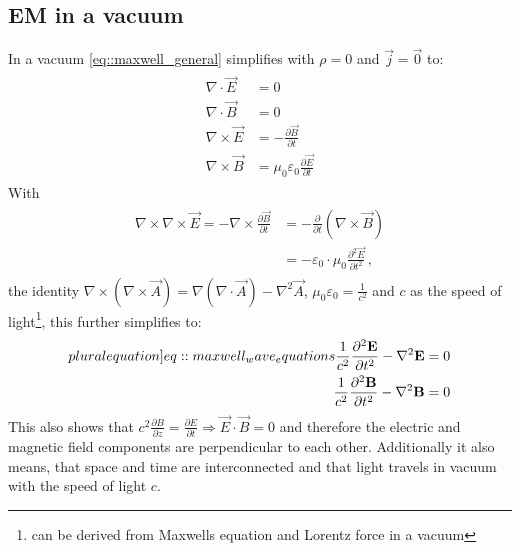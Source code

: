 \subsection{EM in a vacuum}
% 
In a vacuum \cref{eq::maxwell_general} simplifies with $\rho = 0$ and $\vec{j} = \vec{0}$ to:
% 
\begin{align}
\begin{split} \label{eq::maxwell_vacuum}
  \nabla \cdot \vec{E} &= 0 \quad\\
  \nabla \cdot \vec{B} &= 0 \quad\\
  \nabla \times \vec{E} &= -\frac{\partial\vec B}{\partial t}\\
  \nabla \times \vec{B} &= \mu_0\varepsilon_0 \frac{\partial\vec E}{\partial t}
  \end{split}
\end{align}
% 
With 
\begin{align}
\begin{split} 
    \nabla \times \nabla \times \vec{E} = -\nabla \times \frac{\partial \vec{B}} {\partial t} &= -\frac{\partial} {\partial t} \left( \nabla \times  \vec{B} \right)\\
    &= -\varepsilon_0 \cdot \mu_0 \frac{\partial^2 \vec{E}}{\partial t^2} \, ,
\end{split}
\end{align}
% 
the identity $\nabla \times \left( \nabla \times \vec{A} \right) = \nabla(\nabla \cdot \vec{A}) - \nabla^{2}\vec{A}$, $\mu_0\varepsilon_0 = \frac{1}{c^2}$ and $c$ as the speed of light\footnote{can be derived from Maxwells equation and Lorentz force in a vacuum}, this further simplifies to:
% 
\begin{align}
\begin{split} \label[pluralequation]{eq::maxwell_wave_equations}
  \frac{1}{c^2} \frac{\partial^2 \vec{E}}{\partial t^2} - \nabla^2 \vec{E} &= 0 \\
  \frac{1}{c^2} \frac{\partial^2 \vec{B}}{\partial t^2} - \nabla^2 \vec{B} &= 0
\end{split}
\end{align}
% 
% 
% 
This also shows that $c^2  \frac{\partial B} {\partial z} = \frac{\partial E}{\partial t} \Rightarrow \vec{E} \cdot \vec{B} = 0$ and therefore the electric and magnetic field components are perpendicular to each other.
Additionally it also means, that space and time are interconnected and that light travels in vacuum with the speed of light $c$.
% 
